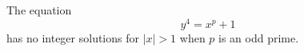 \begin{proposition}
    The equation
\[
    y^4=x^p+1
\]
    has no integer solutions for $|x|>1$ when $p$ is an odd prime.
\end{proposition}

